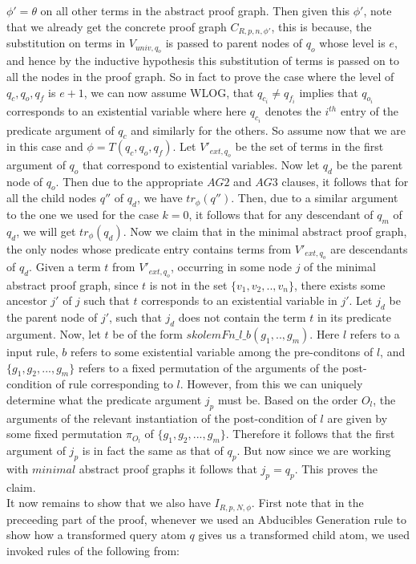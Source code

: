 $\phi' =\theta$ on all other terms in the abstract proof graph. Then given
this $\phi'$, note that we already get the concrete proof graph
$C_{R,p,n,\phi'}$, this is because, the substitution on terms in $V_{univ,q_{o}}$ is passed to parent nodes of $q_{o}$ whose level is $e$, and hence by the inductive hypothesis this substitution of terms is passed on to all the nodes in the proof graph. So in fact to
prove the case where the level of $q_{c},q_{o},q_{f}$ is $e+1$, we can now
assume WLOG, that $q_{c_i}\neq q_{f_i}$ implies that $q_{o_i}$
corresponds to an existential variable where here $q_{c_i}$ denotes the
$i^{th}$ entry of the predicate argument of $q_{c}$ and similarly for the
others. So assume now that we are in this case and
$\phi= T(q_{c},q_{o},q_{f})$. Let $V'_{ext,q_{o}}$ be the set of terms in the
first argument of $q_{o}$ that correspond to existential variables. Now let
$q_{d}$ be the parent node of $q_{o}$. Then due to the appropriate $AG2$ and
$AG3$ clauses, it follows that for all the child nodes $q''$ of $q_{d}$, we
have $tr_{\phi}(q'')$. Then, due to a similar argument to the one we used for the
case $k=0$, it follows that for any descendant of $q_{m}$ of $q_{d}$, we will
get $tr_{\phi}(q_{d})$. Now we claim that in the minimal abstract proof graph, the
only nodes whose predicate entry contains terms from $V'_{ext,q_{o}}$ are
descendants of $q_{d}$. Given a term $t$ from $V'_{ext,q_{o}}$, occurring in some
node $j$ of the minimal abstract proof graph, since $t$ is not in the set
$\{v_{1},v_{2},..,v_{n}\}$, there exists some ancestor $j'$ of $j$ such that
$t$ corresponds to an existential variable in $j'$. Let $j_{d}$ be the parent
node of $j'$, such that $j_{d}$ does not contain the term $t$ in its predicate argument. Now, let $t$ be of the form
$skolemFn\_l\_b(g_{1},..,g_{m})$. Here $l$ refers to a input rule, $b$ refers
to some existential variable among the pre-conditons of $l$, and
$\{g_{1},g_{2},...,g_{m}\}$ refers to a fixed permutation of the arguments of
the post-condition of rule corresponding to $l$. However, from this we can
uniquely determine what the predicate argument $j_{p}$ must be. Based on the order
$O_{l}$, the arguments of the relevant instantiation of the post-condition of
$l$ are given by some fixed permutation $\pi_{O_{l}}$ of
$\{g_{1},g_{2},...,g_{m}\}$. Therefore it follows that the first argument of
$j_{p}$ is in fact the same as that of $q_{p}$. But now since we are working
with $\textit{minimal}$ abstract proof graphs it follows that
$j_{p} = q_{p}$. This proves the claim. \\It now remains to show that we also have $I_{R,p,N,\phi}$. First note that in the preceeding part of the proof, whenever we used an Abducibles Generation rule to show how a transformed query atom $q$ gives us a transformed child atom, we used invoked rules of the following from:
